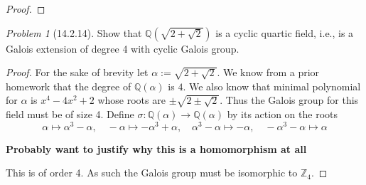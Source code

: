 \documentclass[10pt]{article}
\newcommand{\sk}{\vskip 10mm}
\newcommand{\bb}[1]{\mathbb{#1}}
\theoremstyle{remark}
\newtheorem{problem}{Problem}
\theoremstyle{remark}
\begin{document}
\begin{proof}
  
\end{proof}

\sk

\begin{problem}[14.2.14]
  Show that $\bb{Q}(\sqrt{2+\sqrt{2}})$ is a cyclic quartic field,
  i.e., is a Galois extension of degree 4 with cyclic Galois group.
\end{problem}

\begin{proof}
  For the sake of brevity let $\alpha:=\sqrt{2+\sqrt{2}}$.
  We know from a prior homework that the degree of $\bb{Q}(\alpha)$
  is $4$. We also know that minimal polynomial for $\alpha$ is
  $x^4-4x^2+2$ whose roots are $\pm\sqrt{2\pm\sqrt{2}}$. Thus the Galois group
  for this field must be of size 4. Define $\sigma:\bb{Q}(\alpha)\rightarrow\bb{Q}(\alpha)$ by
  its action on the roots
  \[\alpha\mapsto\alpha^3-\alpha,\quad-\alpha\mapsto-\alpha^3+\alpha,\quad\alpha^3-\alpha\mapsto-\alpha,\quad-\alpha^3-\alpha\mapsto\alpha \]

  \textbf{Probably want to justify why this is a homomorphism at all}
  
  This is of order 4. As such the Galois group must be isomorphic to
  $\bb{Z}_4$.
\end{proof}

\sk

\end{document}

